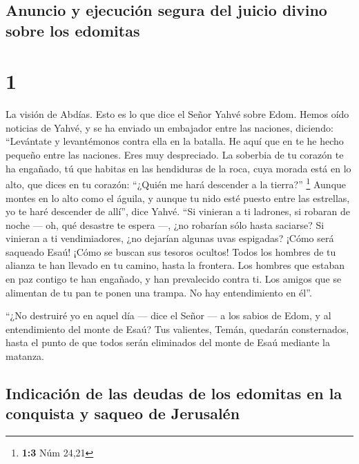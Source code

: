 \hypertarget{anuncio-y-ejecuciuxf3n-segura-del-juicio-divino-sobre-los-edomitas}{%
\subsection{Anuncio y ejecución segura del juicio divino sobre los
edomitas}\label{anuncio-y-ejecuciuxf3n-segura-del-juicio-divino-sobre-los-edomitas}}

\hypertarget{section}{%
\section{1}\label{section}}

 La visión de Abdías. Esto es lo que dice el Señor Yahvé
sobre Edom. Hemos oído noticias de Yahvé, y se ha enviado un embajador
entre las naciones, diciendo: ``Levántate y levantémonos contra ella en
la batalla.  He aquí que en te he hecho pequeño entre las
naciones. Eres muy despreciado.  La soberbia de tu corazón
te ha engañado, tú que habitas en las hendiduras de la roca, cuya morada
está en lo alto, que dices en tu corazón: ``¿Quién me hará descender a
la tierra?'' \footnote{\textbf{1:3} Núm 24,21}  Aunque
montes en lo alto como el águila, y aunque tu nido esté puesto entre las
estrellas, yo te haré descender de allí'', dice Yahvé. 
``Si vinieran a ti ladrones, si robaran de noche --- oh, qué desastre te
espera ---, ¿no robarían sólo hasta saciarse? Si vinieran a ti
vendimiadores, ¿no dejarían algunas uvas espigadas?  ¡Cómo
será saqueado Esaú! ¡Cómo se buscan sus tesoros ocultos! 
Todos los hombres de tu alianza te han llevado en tu camino, hasta la
frontera. Los hombres que estaban en paz contigo te han engañado, y han
prevalecido contra ti. Los amigos que se alimentan de tu pan te ponen
una trampa. No hay entendimiento en él''.

 ``¿No destruiré yo en aquel día --- dice el Señor --- a
los sabios de Edom, y al entendimiento del monte de Esaú? 
Tus valientes, Temán, quedarán consternados, hasta el punto de que todos
serán eliminados del monte de Esaú mediante la matanza.

\hypertarget{indicaciuxf3n-de-las-deudas-de-los-edomitas-en-la-conquista-y-saqueo-de-jerusaluxe9n}{%
\subsection{Indicación de las deudas de los edomitas en la conquista y
saqueo de
Jerusalén}\label{indicaciuxf3n-de-las-deudas-de-los-edomitas-en-la-conquista-y-saqueo-de-jerusaluxe9n}}


